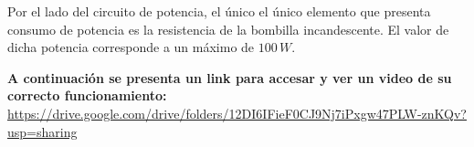 Por el lado del circuito de potencia, el único el único elemento que presenta consumo de potencia es la resistencia de la bombilla incandescente. El valor de dicha potencia corresponde a un máximo de $100\,W$.

 \textbf{A continuación se presenta un link para accesar y ver un video de su correcto funcionamiento:}\\



\hspace{0.5mm}\url{https://drive.google.com/drive/folders/12DI6IFieF0CJ9Nj7iPxgw47PLW-znKQv?usp=sharing} 